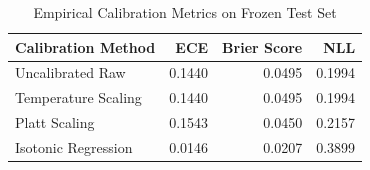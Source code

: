 \begin{table}[htbp]
\caption{Empirical Calibration Metrics on Frozen Test Set}
\begin{center}
\begin{tabular}{lrrr}
\toprule
\textbf{Calibration Method} & \textbf{ECE} & \textbf{Brier Score} & \textbf{NLL} \\
\midrule
Uncalibrated Raw & 0.1440 & 0.0495 & 0.1994 \\
Temperature Scaling & 0.1440 & 0.0495 & 0.1994 \\
Platt Scaling & 0.1543 & 0.0450 & 0.2157 \\
Isotonic Regression & 0.0146 & 0.0207 & 0.3899 \\
\bottomrule
\end{tabular}
\label{tab:calibration}
\end{center}
\end{table}